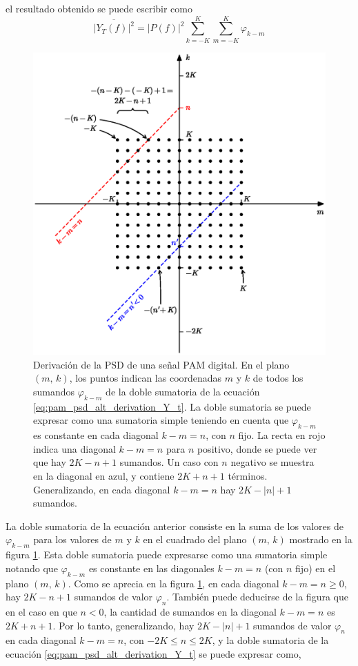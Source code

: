 \documentclass[a4paper]{article}
\begin{document}
el resultado obtenido se puede escribir como
\begin{equation}\label{eq:pam_psd_alt_derivation_Y_t}
 \overline{|Y_T(f)|^2}=|P(f)|^2\sum_{k=-K}^{K}\sum_{m=-K}^{K}\varphi_{k-m} 
\end{equation}
\begin{figure}[!htb]
\begin{center}
\includegraphics[width=0.9\columnwidth]{figuras/digital_pam_double_summation.eps}
\caption{\label{fig:digital_pam_double_summation}Derivación de la PSD de una señal PAM digital. En el plano  \((m,\,k)\), los puntos indican las coordenadas \(m\) y \(k\) de todos los sumandos \(\varphi_{k-m}\) de la doble sumatoria de la ecuación \ref{eq:pam_psd_alt_derivation_Y_t}. La doble sumatoria se puede expresar como una sumatoria simple teniendo en cuenta que \(\varphi_{k-m}\) es constante en cada diagonal \(k-m=n\), con \(n\) fijo. La recta en rojo indica una diagonal  \(k-m=n\) para \(n\) positivo, donde se puede ver que hay \(2K-n+1\) sumandos. Un caso con \(n\) negativo se muestra en la diagonal en azul, y contiene \(2K+n+1\) términos. Generalizando, en cada diagonal \(k-m=n\) hay \(2K-|n|+1\) sumandos.}
\end{center}
\end{figure}
La doble sumatoria de la  ecuación anterior consiste en la suma de los valores de \(\varphi_{k-m}\) para los valores de \(m\) y \(k\) en el cuadrado del plano  \((m,\,k)\) mostrado en la figura  \ref{fig:digital_pam_double_summation}. Esta doble sumatoria puede expresarse como una sumatoria simple notando que \(\varphi_{k-m}\) es constante en las diagonales \(k-m=n\) (con \(n\) fijo) en el plano \((m,\,k)\). Como se aprecia en la figura \ref{fig:digital_pam_double_summation}, en cada diagonal \(k-m=n\geq0\), hay  \(2K-n+1\) sumandos de valor \(\varphi_n\). También puede deducirse de la figura que en el caso en que \(n<0\), la cantidad de sumandos en la diagonal \(k-m=n\) es  \(2K+n+1\). Por lo tanto, generalizando, hay \(2K-|n|+1\) sumandos de valor \(\varphi_n\) en cada diagonal \(k-m=n\), con \(-2K\leq n\leq 2K\), y la doble sumatoria de la ecuación \ref{eq:pam_psd_alt_derivation_Y_t} se puede expresar como,
\end{document}

